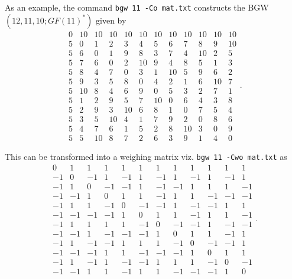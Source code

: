 \documentclass[a4paper,10pt]{article}
\begin{document}
As an example, the command {\tt bgw 11 -Co mat.txt} constructs the BGW$(12,11,10;GF(11)^*)$ given by
\[
 \begin{array}{rrrrrrrrrrrr}
0 & 10 & 10 & 10 & 10 & 10 & 10 & 10 & 10 & 10 & 10 & 10 \\
5 & 0 & 1 & 2 & 3 & 4 & 5 & 6 & 7 & 8 & 9 & 10 \\
5 & 6 & 0 & 1 & 9 & 8 & 3 & 7 & 4 & 10 & 2 & 5 \\
5 & 7 & 6 & 0 & 2 & 10 & 9 & 4 & 8 & 5 & 1 & 3 \\
5 & 8 & 4 & 7 & 0 & 3 & 1 & 10 & 5 & 9 & 6 & 2 \\
5 & 9 & 3 & 5 & 8 & 0 & 4 & 2 & 1 & 6 & 10 & 7 \\
5 & 10 & 8 & 4 & 6 & 9 & 0 & 5 & 3 & 2 & 7 & 1 \\
5 & 1 & 2 & 9 & 5 & 7 & 10 & 0 & 6 & 4 & 3 & 8 \\
5 & 2 & 9 & 3 & 10 & 6 & 8 & 1 & 0 & 7 & 5 & 4 \\
5 & 3 & 5 & 10 & 4 & 1 & 7 & 9 & 2 & 0 & 8 & 6 \\
5 & 4 & 7 & 6 & 1 & 5 & 2 & 8 & 10 & 3 & 0 & 9 \\
5 & 5 & 10 & 8 & 7 & 2 & 6 & 3 & 9 & 1 & 4 & 0
\end{array}.
\]

This can be transformed into a weighing matrix viz. {\tt bgw 11 -Cwo mat.txt} as 
\[
 \begin{array}{rrrrrrrrrrrr}
0 & 1 & 1 & 1 & 1 & 1 & 1 & 1 & 1 & 1 & 1 & 1 \\
-1 & 0 & -1 & 1 & -1 & 1 & -1 & 1 & -1 & 1 & -1 & 1 \\
-1 & 1 & 0 & -1 & -1 & 1 & -1 & -1 & 1 & 1 & 1 & -1 \\
-1 & -1 & 1 & 0 & 1 & 1 & -1 & 1 & 1 & -1 & -1 & -1 \\
-1 & 1 & 1 & -1 & 0 & -1 & -1 & 1 & -1 & -1 & 1 & 1 \\
-1 & -1 & -1 & -1 & 1 & 0 & 1 & 1 & -1 & 1 & 1 & -1 \\
-1 & 1 & 1 & 1 & 1 & -1 & 0 & -1 & -1 & 1 & -1 & -1 \\
-1 & -1 & 1 & -1 & -1 & -1 & 1 & 0 & 1 & 1 & -1 & 1 \\
-1 & 1 & -1 & -1 & 1 & 1 & 1 & -1 & 0 & -1 & -1 & 1 \\
-1 & -1 & -1 & 1 & 1 & -1 & -1 & -1 & 1 & 0 & 1 & 1 \\
-1 & 1 & -1 & 1 & -1 & -1 & 1 & 1 & 1 & -1 & 0 & -1 \\
-1 & -1 & 1 & 1 & -1 & 1 & 1 & -1 & -1 & -1 & 1 & 0
\end{array}.
\]
\end{document}
